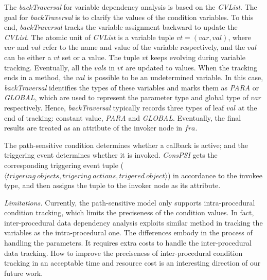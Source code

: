 The \textit{backTraversal} for variable dependency analysis is based on the \textit{CVList}. The goal for \textit{backTraversal} is to clarify the values of the condition variables. To this end, \textit{backTraversal} tracks the variable assignment backward to update the \textit{CVList}. The atomic unit of \textit{CVList} is a variable tuple $\mathit{vt} = (\mathit{var}, \mathit{val})$, where $\mathit{var}$ and $\mathit{val}$ refer to the name and value of the variable respectively, and the $\mathit{val}$ can be either a $\mathit{vt}$ set or a value. The tuple $\mathit{vt}$ keeps evolving during variable tracking. Eventually, all the $\mathit{val}$s in $\mathit{vt}$ are updated to values. %
When the tracking ends in a method, the $\mathit{val}$ is possible to be an undetermined variable.
In this case, \textit{backTraversal} identifies the types of these variables and marks them as \textit{PARA} or \textit{GLOBAL}, which are  used to represent the parameter type and global type of $\mathit{var}$ respectively. 
Hence, \textit{backTraversal} typically records three types of leaf $\mathit{val}$ at the end of tracking: constant value, \textit{PARA} and \textit{GLOBAL}.  %
Eventually, the final results %
are treated as an attribute of the invoker node in $\mathit{fra}$.



The path-sensitive condition determines whether a callback is active; and the triggering event determines whether it is invoked.
\textit{ConsPSI} gets the corresponding triggering event tuple ($\langle \mathit{trigering\ objects}, 
\mathit{trigering\ actions}, \mathit{trigered\ object} \rangle$) in accordance to the invokee type, and then assigns the tuple to the invoker node as its attribute. 


\textit{Limitations.}
Currently, the path-sensitive model only supports intra-procedural condition tracking, which limits the preciseness of the condition values. In fact, inter-procedural data dependency analysis exploits similar method in tracking the variables as the intra-procedural one. The differences embody in the process of handling the parameters. It requires extra costs to handle the inter-procedural data tracking. How to improve the preciseness of inter-procedural condition tracking in an acceptable time and resource cost is an interesting direction of our future work.


